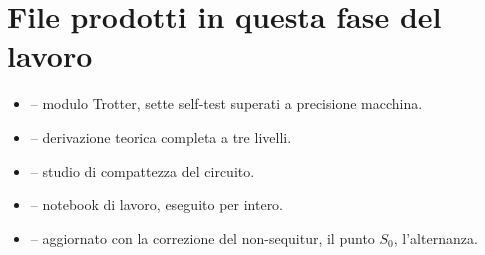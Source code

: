 \documentclass[11pt,a4paper]{article}
\begin{document}
\appendix
\section{File prodotti in questa fase del lavoro}

\begin{itemize}
\item \texttt{} -- modulo Trotter, sette self-test superati a precisione macchina.
\item \texttt{} -- derivazione teorica completa a tre livelli.
\item \texttt{} -- studio di compattezza del circuito.
\item \texttt{} -- notebook di lavoro, eseguito per intero.
\item \texttt{} -- aggiornato con la correzione del non-sequitur, il punto $S_0$, l'alternanza.
\end{itemize}
\end{document}
